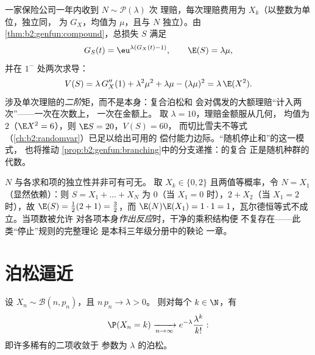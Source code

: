 \begin{example}\label{ex:b2:genfun:compoundpoisson}
一家保险公司一年内收到 $N \sim \mathcal P(\lambda)$ 次
理赔，每次理赔费用为 $X_k$（以整数为单位，独立同，
为 $G_X$，均值为 $\mu$，且与 $N$ 独立）。由
\cref{thm:b2:genfun:compound}，总损失 $S$ 满足
\[
G_S(t) = \eu^{\lambda(G_X(t) - 1)},
\qquad
\E(S) = \lambda\mu ,
\]
并在 $1^-$ 处两次求导：
\[
V(S) = \lambda\,G_X''(1) + \lambda^2\mu^2 + \lambda\mu -
(\lambda\mu)^2 = \lambda\,\E(X^2) .
\]
涉及单次理赔的\emph{二阶}矩，而不是本身：复合泊松和
会对偶发的大额理赔“计入两次”——一次在次数上，
一次在金额上。
取 $\lambda = 10$，理赔金额服从几何，
均值为 $2$（$\E X^2 = 6$），则 $\E S = 20$，$V(S) = 60$，
而切比雪夫不等式（\cref{ch:b2:randomvar}）已足以给出可用的
偿付能力边际。“随机停止和”的这一模式，
也将推动
\cref{prop:b2:genfun:branching}中的分支递推：的复合
正是随机种群的代数。
\end{example}

\begin{remark}
$N$ 与各求和项的独立性并非可有可无。
取 $X_k \in \{0, 2\}$ 且两值等概率，令 $N =
X_1$（显然依赖）：则 $S = X_1 + \dots + X_N$ 为
$0$（当 $X_1 = 0$ 时），$2 + X_2$（当 $X_1 = 2$ 时），故 $\E(S) =
\frac12(2 + 1) = \frac32$，而 $\E(N)\E(X_1) = 1\cdot1 =
1$，瓦尔德恒等式不成立。当项数被允许
对各项本身\emph{作出反应}时，干净的乘积结构便
不复存在——此类“停止”规则的完整理论
是本科三年级分册中的鞅论
一章。
\end{remark}

\section{泊松逼近}

\begin{theorem}[稀有事件律]\label{thm:b2:genfun:rareevents}
设 $X_n \sim \mathcal{B}(n, p_n)$，且 $n\,p_n \to \lambda > 0$。
则对每个 $k \in \N$，有
\[
\P(X_n = k)
\xrightarrow[n\to\infty]{}
e^{-\lambda}\frac{\lambda^k}{k!} :
\]
即许多稀有的二项收敛于
参数为 $\lambda$ 的泊松。
\end{theorem}

